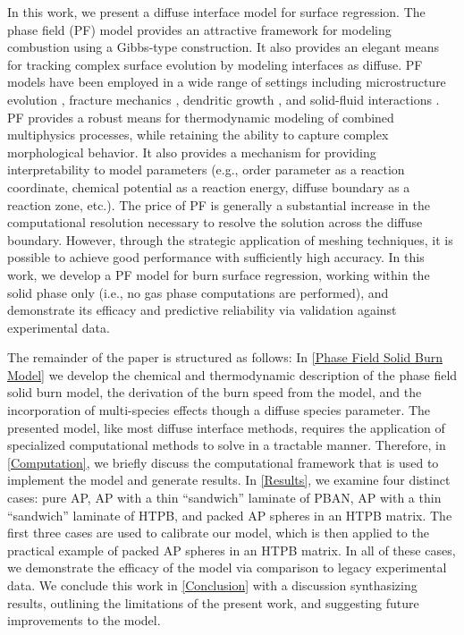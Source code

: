 \documentclass[colorinlistoftodos,review]{elsarticle}
\begin{document}
In this work, we present a diffuse interface model for surface regression.
The phase field (PF) model provides an attractive framework for modeling combustion \cite{stewart2003thermomechanical,stewart2003thermomechanical2,stewart2020modeling} using a Gibbs-type construction.
It also provides an elegant means for tracking complex surface evolution by modeling interfaces as diffuse.
PF models have been employed in a wide range of settings including microstructure evolution \cite{chen2002phase,gokuli2021multiphase,moelans2008introduction}, fracture mechanics \cite{agrawal2021block,wang2020phase}, dendritic growth \cite{ratkai2019phase}, and solid-fluid interactions \cite{favrie2009solid, anderson1998diffuse, zhang2016diffuse}.
PF provides a robust means for thermodynamic modeling of combined multiphysics processes, while retaining the ability to capture complex morphological behavior.
It also provides a mechanism for providing interpretability to model parameters (e.g., order parameter as a reaction coordinate, chemical potential as a reaction energy, diffuse boundary as a reaction zone, etc.).
The price of PF is generally a substantial increase in the computational resolution necessary to resolve the solution across the diffuse boundary.
However, through the strategic application of meshing techniques, it is possible to achieve good performance with sufficiently high accuracy.
In this work, we develop a PF model for burn surface regression, working within the solid phase only (i.e., no gas phase computations are performed), and demonstrate its efficacy and predictive reliability via validation against experimental data.

The remainder of the paper is structured as follows:
In \cref{Phase Field Solid Burn Model} we develop the chemical and thermodynamic description of the phase field solid burn model, the derivation of the burn speed from the model, and the incorporation of multi-species effects though a diffuse species parameter. 
The presented model, like most diffuse interface methods, requires the application of specialized computational methods to solve in a tractable manner.
Therefore, in \cref{Computation}, we briefly discuss the computational framework that is used to implement the model and generate results.
In \cref{Results}, we examine four distinct cases: pure AP, AP with a thin ``sandwich'' laminate of PBAN, AP with a thin ``sandwich'' laminate of HTPB, and packed AP spheres in an HTPB matrix.
The first three cases are used to calibrate our model, which is then applied to the practical example of packed AP spheres in an HTPB matrix.
In all of these cases, we demonstrate the efficacy of the model via comparison to legacy experimental data.
We conclude this work in \cref{Conclusion} with a discussion synthasizing results, outlining the limitations of the present work, and suggesting future improvements to the model.
\end{document}
